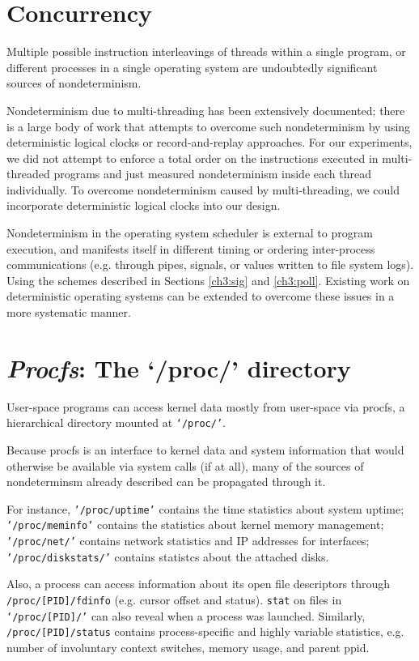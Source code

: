 \section{Concurrency} \label{ch3:concurrency}
Multiple possible instruction interleavings of 
threads within a single program, 
or different processes in 
a single operating system are
undoubtedly significant sources
of nondeterminism.

Nondeterminism due to multi-threading
has been extensively documented; there
is a large body of work that
attempts to overcome such nondeterminism
by using deterministic logical clocks
or record-and-replay approaches. 
For our experiments, we did not attempt to enforce
a total order on the instructions executed in multi-threaded
programs and just measured nondeterminism inside each
thread individually. To
overcome nondeterminism caused
by multi-threading, we could incorporate
deterministic logical clocks 
into our design.

Nondeterminism in the operating system
scheduler is external to 
program execution, and manifests itself
in different timing or ordering
inter-process communications (e.g.
through pipes, signals, or 
values written to file system logs).
Using the schemes described
in Sections \ref{ch3:sig} and 
\ref{ch3:poll}. Existing
work on deterministic
operating systems can
be extended to overcome these issues
in a more systematic manner.

\section{{\em Procfs}: The `/proc/' directory}\label{ch3:procfs}
User-space programs
can access kernel data mostly
from user-space via procfs,
a hierarchical directory mounted
at \texttt{`/proc/'}.

Because procfs is an interface
to kernel data and system information
that would otherwise be available
via system calls (if at all),
many of the sources of nondeterminsm
already described can be propagated
through it.

For instance, \texttt{'/proc/uptime'}
contains the time statistics
about system uptime;
\texttt{'/proc/meminfo'}
contains the statistics
about kernel memory management;
\texttt{'/proc/net/'}
contains network statistics
and IP addresses for interfaces;
\texttt{'/proc/diskstats/'}
contains statistcs about the
attached disks.

Also, a process can access 
information about its open file descriptors through
\texttt{/proc/[PID]/fdinfo} (e.g. cursor offset and status).
\texttt{stat} on files in \texttt{`/proc/[PID]/'}
can also reveal when a process was launched.
Similarly, \texttt{/proc/[PID]/status} contains
process-specific and highly variable statistics,
e.g. number of involuntary context switches,
memory usage, and parent ppid.

